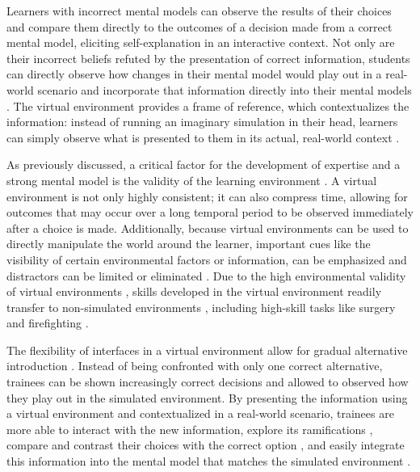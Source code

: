 Learners with incorrect mental models can observe the results of their choices and compare them directly to the outcomes of a decision made from a correct mental model, eliciting self-explanation in an interactive context. Not only are their incorrect beliefs refuted by the presentation of correct information, students can directly observe how changes in their mental model would play out in a real-world scenario and incorporate that information directly into their mental models \citep{Salzman1999}. The virtual environment provides a frame of reference, which contextualizes the information: instead of running an imaginary simulation in their head, learners can simply observe what is presented to them in its actual, real-world context \citep{Erickson1993}.

As previously discussed, a critical factor for the development of expertise and a strong mental model is the validity of the learning environment \citep{Klein2006, Kahneman2009}. A virtual environment is not only highly consistent; it can also compress time, allowing for outcomes that may occur over a long temporal period to be observed immediately after a choice is made. Additionally, because virtual environments can be used to directly manipulate the world around the learner, important cues like the visibility of certain environmental factors or information, can be emphasized and distractors can be limited or eliminated \citep{Salzman1999}. Due to the high environmental validity of virtual environments \citep{Loomis1999}, skills developed in the virtual environment readily transfer to non-simulated environments \citep{Cromby1996, Watanuki2007}, including high-skill tasks like surgery \citep{Seymour2002} and firefighting \citep{Bliss1997}.

The flexibility of interfaces in a virtual environment allow for gradual alternative introduction \citep{Erickson1993}. Instead of being confronted with only one correct alternative, trainees can be shown increasingly correct decisions and allowed to observed how they play out in the simulated environment. By presenting the information using a virtual environment and contextualized in a real-world scenario, trainees are more able to interact with the new information, explore its ramifications \citep{Erickson1993, Patterson2010}, compare and contrast their choices with the correct option \citep{Fowlkes2009}, and easily integrate this information into the mental model that matches the simulated environment \citep{Salzman1999}.

